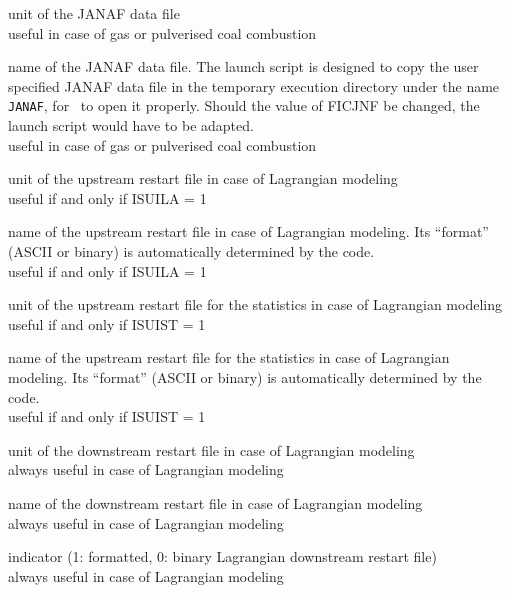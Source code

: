 {unit of the JANAF data file\\ 
useful in case of gas or pulverised coal combustion}

{name of the JANAF data file. The launch script is designed to copy the
user specified JANAF data file in the temporary execution directory
under the name \texttt{JANAF}, for \CS\ to open it properly. Should the value
of FICJNF be changed, the launch script would have to be adapted.\\
useful in case of gas or pulverised coal combustion}


{unit of the upstream restart file in case of Lagrangian modeling\\ 
useful if and only if ISUILA = 1}

{name of the upstream restart file in case of Lagrangian modeling.
Its ``format'' (ASCII or
binary) is automatically determined by the code.\\
useful if and only if ISUILA = 1}

{unit of the upstream restart file for the statistics in case of
Lagrangian modeling\\ 
useful if and only if ISUIST = 1}

{name of the upstream restart file for the statistics in case of
Lagrangian modeling. Its ``format'' (ASCII or
binary) is automatically determined by the code.\\
useful if and only if ISUIST = 1}

{unit of the downstream restart file in case of Lagrangian modeling\\
always useful in case of Lagrangian modeling}

{name of the downstream restart file in case of Lagrangian modeling\\
always useful in case of Lagrangian modeling}

{indicator (1: formatted, 0: binary Lagrangian downstream restart file)\\
always useful in case of Lagrangian modeling}

